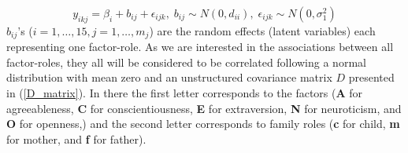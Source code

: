 \documentclass[11pt,a5paper,twoside]{book}
\begin{document}
\begin{equation}
\label{main_model}
y_{ikj}=\beta_i + b_{ij} + \epsilon_{ijk},\;b_{ij}\sim N(0,d_{ii}),\;\epsilon_{ijk}\sim N(0,\sigma_1^2)
\end{equation}
$b_{ij}$'s ($i=1,\ldots,15, j=1,\ldots,m_j$) are the random effects (latent variables) each representing one factor-role. As we are interested in the associations between all factor-roles, they all will be considered to be correlated following a normal distribution with mean zero and an unstructured covariance matrix $D$ presented in (\ref{D_matrix}). In there the first letter corresponds to the factors (\textbf{A} for agreeableness, \textbf{C} for conscientiousness, \textbf{E} for extraversion, \textbf{N} for neuroticism, and \textbf{O} for openness,) and the second letter corresponds to family roles (\textbf{c} for child, \textbf{m} for mother, and \textbf{f} for father).
\end{document}
